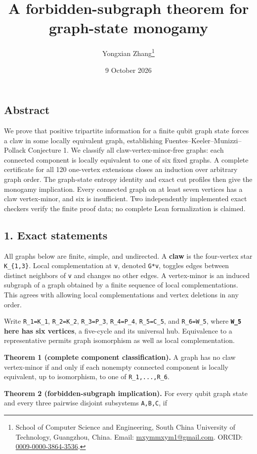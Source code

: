\documentclass[
  11pt,
]{article}
\title{A forbidden-subgraph theorem for graph-state monogamy}
\author{Yongxian Zhang\thanks{School of Computer Science and Engineering,
South China University of Technology, Guangzhou, China.
Email: \href{mailto:mxymmxym1@gmail.com}{mxymmxym1@gmail.com}.
ORCID: \href{https://orcid.org/0009-0000-3864-3536}{0009-0000-3864-3536}.}}
\date{9 October 2026}
\begin{document}
\maketitle

\subsection{Abstract}\label{abstract}

We prove that positive tripartite information for a finite qubit graph
state forces a claw in some locally equivalent graph, establishing
Fuentes--Keeler--Munizzi--Pollack Conjecture 1. We classify all
claw-vertex-minor-free graphs: each connected component is locally
equivalent to one of six fixed graphs. A complete certificate for all
120 one-vertex extensions closes an induction over arbitrary graph
order. The graph-state entropy identity and exact cut profiles then give
the monogamy implication. Every connected graph on at least seven
vertices has a claw vertex-minor, and six is insufficient. Two
independently implemented exact checkers verify the finite proof data;
no complete Lean formalization is claimed.

\subsection{1. Exact statements}\label{exact-statements}

All graphs below are finite, simple, and undirected. A \textbf{claw} is
the four-vertex star \texttt{K\_\{1,3\}}. Local complementation at
\texttt{v}, denoted \texttt{G*v}, toggles edges between distinct
neighbors of \texttt{v} and changes no other edges. A vertex-minor is an
induced subgraph of a graph obtained by a finite sequence of local
complementations. This agrees with allowing local complementations and
vertex deletions in any order.

Write \texttt{R\_1=K\_1}, \texttt{R\_2=K\_2}, \texttt{R\_3=P\_3},
\texttt{R\_4=P\_4}, \texttt{R\_5=C\_5}, and \texttt{R\_6=W\_5}, where
\textbf{\texttt{W\_5} here has six vertices}, a five-cycle and its
universal hub. Equivalence to a representative permits graph isomorphism
as well as local complementation.

\textbf{Theorem 1 (complete component classification).} A graph has no
claw vertex-minor if and only if each nonempty connected component is
locally equivalent, up to isomorphism, to one of \texttt{R\_1,...,R\_6}.

\textbf{Theorem 2 (forbidden-subgraph implication).} For every qubit
graph state and every three pairwise disjoint subsystems \texttt{A,B,C},
if
\end{document}
